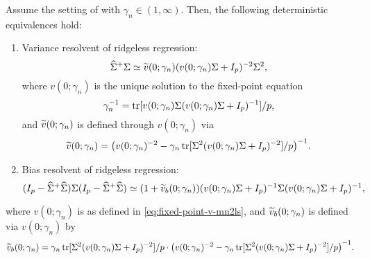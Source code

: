 \documentclass{article}
\begin{document}
\begin{lemma}
    \label{lem:deter-approx-generalized-ridgeless}
    Assume the setting of 
    with $\gamma_n \in (1, \infty)$.
    Then,
    the following deterministic equivalences hold:
    \begin{enumerate}
        \item Variance resolvent of ridgeless regression:
        \begin{equation}
            \label{eq:detequi-mn2ls-genbias}
            {\widehat{\Sigma}}^{+} \Sigma
            \simeq
            \widetilde{v}(0; \gamma_n)
            (v(0; \gamma_n) \Sigma + I_p)^{-2} \Sigma^2,
        \end{equation}
        where $v(0; \gamma_n)$ is the unique solution
        to the fixed-point equation
        \begin{equation}
            \label{eq:fixed-point-v-mn2ls}
            \gamma_n^{-1}
            = \operatorname{tr}[v(0; \gamma_n) \Sigma (v(0; \gamma_n) \Sigma + I_p)^{-1}] / p,
        \end{equation}
        and $\widetilde{v}(0; \gamma_n)$ is defined through $v(0; \gamma_n)$  via
        \begin{equation}
            \label{eq:def-vg-mn2ls-tv}
            \widetilde{v}(0; \gamma_n)
            = \big( v(0; \gamma_n)^{-2} - \gamma_n \operatorname{tr}[\Sigma^2 (v(0; \gamma_n) \Sigma + I_p)^{-2}] / p \big)^{-1}.
        \end{equation}
        \item Bias resolvent of ridgeless regression:
        \begin{equation}
            (I_p - {\widehat{\Sigma}}^{+} {\widehat{\Sigma}})
            \Sigma
            (I_p - {\widehat{\Sigma}}^{+} {\widehat{\Sigma}})
            \simeq
            (1 + \widetilde{v}_b(0; \gamma_n))
            (v(0; \gamma_n) \Sigma + I_p)^{-1}
            \Sigma
            (v(0; \gamma_n) \Sigma + I_p)^{-1},
        \end{equation}
    \end{enumerate}
\end{lemma}
where $v(0; \gamma_n)$ is as defined in \eqref{eq:fixed-point-v-mn2ls},
and $\widetilde{v}_b(0; \gamma_n)$ is defined via $v(0; \gamma_n)$ by
\begin{equation}
    \label{eq:def-tv-mn2ls-tvg}
    \widetilde{v}_b(0; \gamma_n)
    =
    \gamma_n
    \operatorname{tr}[\Sigma^2 (v(0; \gamma_n) \Sigma + I_p)^{-2}] / p
    \cdot
    \big(v(0; \gamma_n)^{-2} - \gamma_n \operatorname{tr}[\Sigma^2 (v(0; \gamma_n) \Sigma + I_p)^{-2}] / p\big)^{-1}.
\end{equation}
\end{document}
